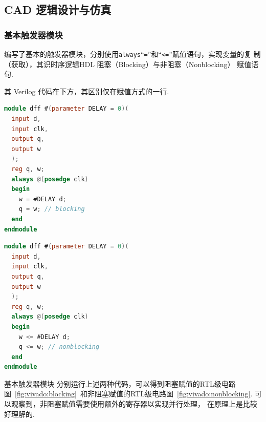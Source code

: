\documentclass[11pt]{SEU-Digital-Report}
\begin{document}
  \subsection{CAD 逻辑设计与仿真}

    \subsubsection{基本触发器模块}

    编写了基本的触发器模块，分别使用\texttt{always}“\texttt{=}”和“\texttt{<=}”赋值语句，实现变量的复
    制（获取），其识时序逻辑HDL 阻塞（Blocking）与非阻塞（Nonblocking） 赋值语句.

    其 Verilog 代码在下方，其区别仅在赋值方式的一行.
    
    \newpage
    \begin{multicols}{2}
      \begin{lstlisting}[language=verilog, title=Blocking, numbers=none]
module dff #(parameter DELAY = 0)(
  input d,
  input clk,
  output q,
  output w
  );
  reg q, w;
  always @(posedge clk)
  begin
    w = #DELAY d;
    q = w; // blocking
  end
endmodule
      \end{lstlisting}
      \begin{lstlisting}[language=verilog, title=Nonblocking, numbers=none]
module dff #(parameter DELAY = 0)(
  input d,
  input clk,
  output q,
  output w
  );
  reg q, w;
  always @(posedge clk)
  begin
    w <= #DELAY d;
    q <= w; // nonblocking
  end
endmodule
      \end{lstlisting}
    \end{multicols}

    \begin{analyze}{基本触发器模块}{}
      分别运行上述两种代码，可以得到阻塞赋值的RTL级电路图~\ref{fig:vivado:blocking}~和非阻塞赋值的RTL级电路图~\ref{fig:vivado:nonblocking}.
      可以观察到，非阻塞赋值需要使用额外的寄存器以实现并行处理，
      在原理上是比较好理解的.
    \end{analyze}
\end{document}

